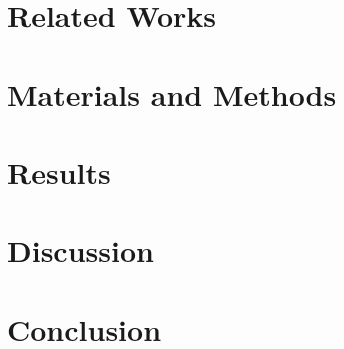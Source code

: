 \documentclass[AMA,Times1COL]{WileyNJD-v5}
\begin{document}
\section{Related Works}
\label{sec:related_works}


\section{Materials and Methods}
\label{sec:materials_methods}


\section{Results}
\label{sec:results}


\section{Discussion}
\label{sec:discussion}


\section{Conclusion}
\label{sec:conclusion}









\end{document}
